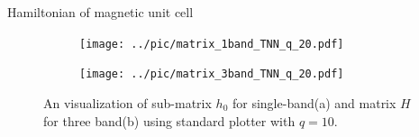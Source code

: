 \documentclass[aspectratio=169,compress,x11names]{beamer}
\begin{document}
	\begin{frame}{Hamiltonian of magnetic unit cell}
		\begin{figure}
			\centering
			\begin{subfigure}[b]{0.495\textwidth}
				\centering
				\texttt{[image: ../pic/matrix\_1band\_TNN\_q\_20.pdf]}
				\label{fig:3 band matrix}
			\end{subfigure}
			\begin{subfigure}[b]{0.495\textwidth}
				\centering
				\texttt{[image: ../pic/matrix\_3band\_TNN\_q\_20.pdf]}
				\label{fig:1 band matrix}
			\end{subfigure}
			\caption[A visualization of super matrix.]{
				An visualization of sub-matrix $h_{0}$ for single-band(a) and matrix $H$ for three band(b) using standard plotter with $q = 10$.
			}
		\end{figure}
	\end{frame}
\end{document}
